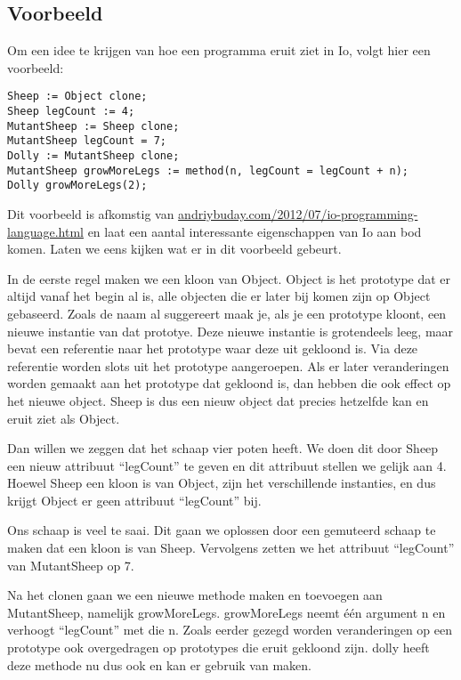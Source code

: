 \documentclass[12pt]{article}
\begin{document}
\pagebreak

\subsection*{Voorbeeld}
Om een idee te krijgen van hoe een programma eruit ziet in Io, volgt hier een voorbeeld:
\begin{lstlisting}[frame=single]
Sheep := Object clone;
Sheep legCount := 4;
MutantSheep := Sheep clone;
MutantSheep legCount = 7;
Dolly := MutantSheep clone;
MutantSheep growMoreLegs := method(n, legCount = legCount + n);
Dolly growMoreLegs(2);
\end{lstlisting}
Dit voorbeeld is afkomstig van \url{andriybuday.com/2012/07/io-programming-language.html} en laat een aantal interessante eigenschappen van Io aan bod komen. Laten we eens kijken wat er in dit voorbeeld gebeurt.

In de eerste regel maken we een kloon van Object. Object is het prototype dat er altijd vanaf het begin al is,
alle objecten die er later bij komen zijn op Object gebaseerd.
Zoals de naam al suggereert maak je, als je een prototype kloont, een nieuwe instantie van dat prototye.
Deze nieuwe instantie is grotendeels leeg, maar bevat een referentie naar het prototype waar deze uit gekloond is. Via deze referentie worden slots uit het prototype aangeroepen.
Als er later veranderingen worden gemaakt aan het prototype dat gekloond is, dan hebben die ook effect op het nieuwe object.
Sheep is dus een nieuw object dat precies hetzelfde kan en eruit ziet als Object.\newline

Dan willen we zeggen dat het schaap vier poten heeft.
We doen dit door Sheep een nieuw attribuut ``legCount'' te geven en dit attribuut stellen we gelijk aan 4.
Hoewel Sheep een kloon is van Object, zijn het verschillende instanties, en dus krijgt Object er geen attribuut ``legCount'' bij.\newline

Ons schaap is veel te saai. Dit gaan we oplossen door een gemuteerd schaap te maken dat een kloon is van Sheep. Vervolgens zetten we het attribuut ``legCount'' van MutantSheep op 7.\newline

Na het clonen gaan we een nieuwe methode maken en toevoegen aan MutantSheep, namelijk growMoreLegs.
growMoreLegs neemt één argument n en verhoogt ``legCount'' met die n. 
Zoals eerder gezegd worden veranderingen op een prototype ook overgedragen op prototypes die eruit gekloond zijn. dolly heeft deze methode nu dus ook en kan er gebruik van maken.\newline
\end{document}
